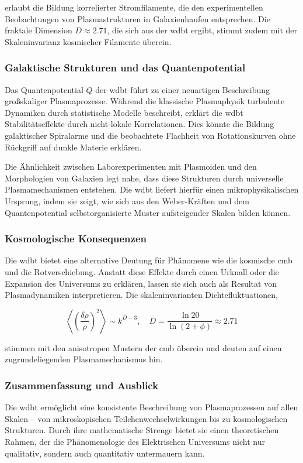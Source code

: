erlaubt die Bildung korrelierter Stromfilamente, die den experimentellen Beobachtungen von Plasmastrukturen in Galaxienhaufen entsprechen. Die fraktale Dimension $D \approx 2.71$,
die sich aus der \gls{wdbt} ergibt, stimmt zudem mit der Skaleninvarianz kosmischer Filamente überein.

\subsubsection{Galaktische Strukturen und das Quantenpotential}
Das Quantenpotential $Q$ der \gls{wdbt} führt zu einer neuartigen Beschreibung großskaliger Plasmaprozesse. Während die klassische Plasmaphysik turbulente Dynamiken durch
statistische Modelle beschreibt, erklärt die \gls{wdbt} Stabilitätseffekte durch nicht-lokale Korrelationen. Dies könnte die Bildung galaktischer Spiralarme und die beobachtete
Flachheit von Rotationskurven ohne Rückgriff auf dunkle Materie erklären.

Die Ähnlichkeit zwischen Laborexperimenten mit Plasmoiden und den Morphologien von Galaxien legt nahe, dass diese Strukturen durch universelle Plasmamechanismen entstehen.
Die \gls{wdbt} liefert hierfür einen mikrophysikalischen Ursprung, indem sie zeigt, wie sich aus den Weber-Kräften und dem Quantenpotential selbstorganisierte Muster aufsteigender
Skalen bilden können.

\subsubsection{Kosmologische Konsequenzen}
Die \gls{wdbt} bietet eine alternative Deutung für Phänomene wie die kosmische \gls{cmb} und die Rotverschiebung. Anstatt diese Effekte durch einen Urknall oder die Expansion des
Universums zu erklären, lassen sie sich auch als Resultat von Plasmadynamiken interpretieren. Die skaleninvarianten Dichtefluktuationen,

\begin{equation}
\left\langle \left( \frac{\delta \rho}{\rho} \right)^2 \right\rangle \sim k^{D-3}, \quad 
D = \frac{\ln 20}{\ln(2+\phi)} \approx 2.71
\end{equation}

stimmen mit den anisotropen Mustern der \gls{cmb} überein und deuten auf einen zugrundeliegenden Plasmamechanismus hin.

\subsubsection{Zusammenfassung und Ausblick}
Die \gls{wdbt} ermöglicht eine konsistente Beschreibung von Plasmaprozessen auf allen Skalen – von mikroskopischen Teilchenwechselwirkungen bis zu kosmologischen Strukturen.
Durch ihre mathematische Strenge bietet sie einen theoretischen Rahmen, der die Phänomenologie des Elektrischen Universums nicht nur qualitativ, sondern auch quantitativ
untermauern kann.

